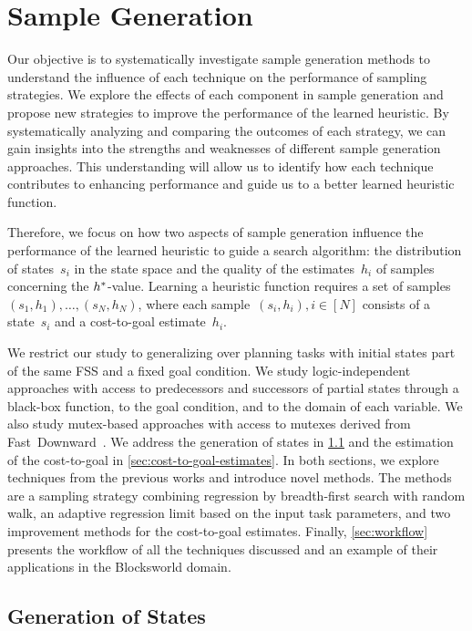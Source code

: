 \chapter{Sample Generation}
\label{sec:sampling}

Our objective is to systematically investigate sample generation methods to understand the influence of each technique on the performance of sampling strategies. We explore the effects of each component in sample generation and propose new strategies to improve the performance of the learned heuristic. By systematically analyzing and comparing the outcomes of each strategy, we can gain insights into the strengths and weaknesses of different sample generation approaches. This understanding will allow us to identify how each technique contributes to enhancing performance and guide us to a better learned heuristic function.

Therefore, we focus on how two aspects of sample generation influence the performance of the learned heuristic to guide a search algorithm: the distribution of states~$s_i$ in the state space and the quality of the estimates~$h_i$ of samples concerning the $h^{*}$-value. Learning a heuristic function requires a set of samples~$(s_1,h_1),\ldots,(s_N,h_N)$, where each sample~$(s_i,h_i), i\in[N]$ consists of a state~$s_i$ and a cost-to-goal estimate~$h_i$.

We restrict our study to generalizing over planning tasks with initial states part of the same FSS and a fixed goal condition. We study logic-independent approaches with access to predecessors and successors of partial states through a black-box function, to the goal condition, and to the domain of each variable. We also study mutex-based approaches with access to mutexes derived from Fast~Downward~\cite{helmert2006fast}. We address the generation of states in \cref{sec:state-generation} and the estimation of the cost-to-goal in \cref{sec:cost-to-goal-estimates}. In both sections, we explore techniques from the previous works and introduce novel methods. The methods are a sampling strategy combining regression by breadth-first search with random walk, an adaptive regression limit based on the input task parameters, and two improvement methods for the cost-to-goal estimates. Finally, \cref{sec:workflow} presents the workflow of all the techniques discussed and an example of their applications in the Blocksworld domain.

\section{Generation of States}
\label{sec:state-generation}

